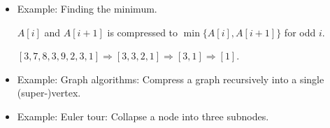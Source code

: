 \documentclass{article}
\begin{document}
\begin{itemize}

\item Example: Finding the minimum.

$A[i]$ and $A[i+1]$ is compressed to $\min\{A[i],A[i+1]\}$ for odd $i$.

$[3,7,8,3,9,2,3,1]\Rightarrow [3,3,2,1]\Rightarrow [3,1]
\Rightarrow [1]$.

\item Example: Graph algorithms: Compress a graph recursively into
a single (super-)vertex.

\item Example: Euler tour: Collapse a node into three subnodes.

\end{itemize}
\end{document}
